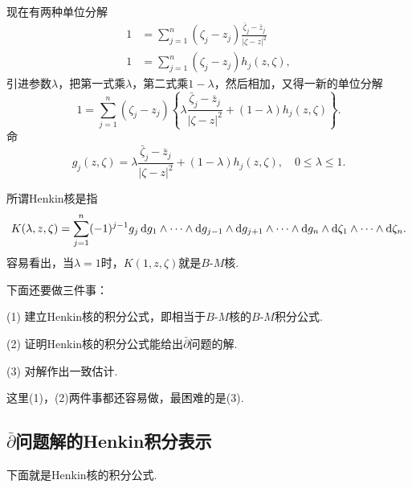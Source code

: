 现在有两种单位分解
\begin{align*}
	1
	&=\sum_{j=1}^{n}(\zeta_j-z_j)\frac{\bar{\zeta}_j-\bar{z}_j}{|\zeta-z|^2}\\
	1
	&=\sum_{j=1}^{n}(\zeta_j-z_j)h_j(z,\zeta),
\end{align*}
引进参数$\lambda$，把第一式乘$\lambda$，第二式乘$1-\lambda$，然后相加，又得一新的单位分解
\[1=\sum_{j=1}^{n}(\zeta_j-z_j)\left\{\lambda\frac{\bar{\zeta}_j-\bar{z}_j}{|\zeta-z|^2}+(1-\lambda)h_j(z,\zeta)\right\}.\]
命
\[g_j(z,\zeta)=\lambda\frac{\bar{\zeta}_j-\bar{z}_j}{|\zeta-z|^2}+(1-\lambda)h_j(z,\zeta),\quad 0\le\lambda\le1.\]

所谓Henkin核是指
\[K(\lambda,z,\zeta)=\sum_{j=1}^{n}(-1)^{j-1}g_j\mathop{}\!\mathrm{d} g_1\wedge\cdots\wedge\mathop{}\!\mathrm{d} g_{j-1}\wedge\mathop{}\!\mathrm{d} g_{j+1}\wedge\cdots\wedge\mathop{}\!\mathrm{d} g_n\wedge\mathop{}\!\mathrm{d}\zeta_1\wedge\cdots\wedge\mathop{}\!\mathrm{d} \zeta_n.\]
容易看出，当$\lambda=1$时，$K(1,z,\zeta)$就是$B\text{-}M$核.

下面还要做三件事：

(1)
建立Henkin核的积分公式，即相当于$B\text{-}M$核的$B\text{-}M$积分公式.

(2)
证明Henkin核的积分公式能给出$\bar{\partial}$问题的解.

(3)
对解作出一致估计.

这里(1)，(2)两件事都还容易做，最困难的是(3).
\subsection{$\bar{\partial}$问题解的Henkin积分表示}
下面就是Henkin核的积分公式.

